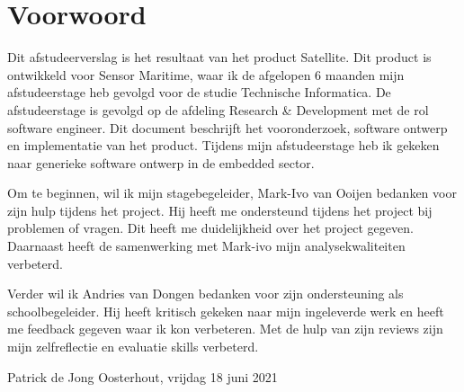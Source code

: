 \chapter*{Voorwoord}
Dit afstudeerverslag is het resultaat van het product Satellite. Dit product is ontwikkeld voor Sensor Maritime, waar ik de afgelopen 6 maanden mijn afstudeerstage heb gevolgd voor de studie Technische Informatica. De afstudeerstage is gevolgd op de afdeling Research \& Development met de rol software engineer. Dit document beschrijft het vooronderzoek, software ontwerp en implementatie van het product. Tijdens mijn afstudeerstage heb ik gekeken naar generieke software ontwerp in de embedded sector. \newline

\noindent Om te beginnen, wil ik mijn stagebegeleider, Mark-Ivo van Ooijen bedanken voor zijn hulp tijdens het project. Hij heeft me ondersteund tijdens het project bij problemen of vragen. Dit heeft me duidelijkheid over het project gegeven. Daarnaast heeft de samenwerking met Mark-ivo mijn analysekwaliteiten verbeterd. \newline 

\noindent Verder wil ik Andries van Dongen bedanken voor zijn ondersteuning als schoolbegeleider. Hij heeft kritisch gekeken naar mijn ingeleverde werk en heeft me feedback gegeven waar ik kon verbeteren. Met de hulp van zijn reviews zijn mijn zelfreflectie en evaluatie skills verbeterd. \newline

\noindent Patrick de Jong \newline
\noindent Oosterhout, vrijdag 18 juni 2021